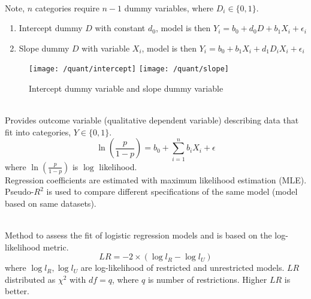 \begin{remark} \\
Note, $n$ categories require $n-1$ dummy variables, where $D_i \in \{0, 1\}$.
\begin{enumerate}[label=\roman*.]
\setlength{\itemsep}{0pt}
\item Intercept dummy $D$ with constant $d_0$, model is then $Y_i = b_0 + d_0 D + b_1 X_i + \epsilon_i$
\item Slope dummy $D$ with variable $X_i$, model is then $Y_i = b_0 + b_1 X_i + d_1 D_i X_i + \epsilon_i$
\end{enumerate}
\end{remark}

\begin{figure}[H]
\centering
\texttt{[image: /quant/intercept]}
\texttt{[image: /quant/slope]}
\caption{Intercept dummy variable and slope dummy variable}
\end{figure}

\begin{definition} \\
Provides outcome variable (qualitative dependent variable) describing data that fit into categories, $Y \in \{0, 1\}$.
\begin{equation}
\ln \left( \frac{p}{1-p} \right) = b_0 + \sum\limits_{i=1}^n b_i X_i + \epsilon \nonumber
\end{equation}
where $\ln \left( \frac{p}{1-p} \right)$ is $\log$ likelihood.\\
Regression coefficients are estimated with maximum likelihood estimation (MLE).\\
Pseudo-$R^2$ is used to compare different specifications of the same model (model based on same datasets).
\end{definition}

\begin{definition} \\
Method to assess the fit of logistic regression models and is based on the log-likelihood metric.
\begin{equation}
LR = -2 \times (\log l_{R} - \log l_{U}) \nonumber
\end{equation}
where $\log l_{R}, \log l_{U}$ are log-likelihood of restricted and unrestricted models.
$LR$ distributed as $\chi^2$ with $df = q$, where $q$ is number of restrictions. Higher $LR$ is better.
\end{definition}